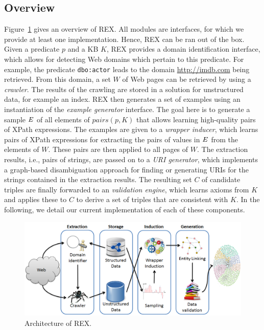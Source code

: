 \subsection{Overview}
Figure~\ref{charex:fig:architecture} gives an overview of REX. 
All modules are interfaces, for which we provide at least one implementation.
Hence, REX can be ran out of the box.
Given a predicate $p$ and a  \ac{KB} $K$, REX provides a domain identification interface, which allows for detecting Web domains which pertain to this predicate.
For example, the predicate \texttt{dbo:actor} leads to the domain \url{http://imdb.com} being retrieved.
From this domain,  a set $W$ of Web pages can be retrieved by using a \emph{crawler}.
The results of the crawling are stored in a solution for unstructured data, for example an index. 
REX then generates a set of examples using an instantiation of the \emph{example generator} interface. 
The goal here is to generate a sample $\mbox{\ensuremath{E}}$ of all elements of $pairs(p, K)$ that allows learning high-quality pairs of XPath expressions. 
The examples are given to a \emph{wrapper inducer}, which learns pairs of XPath expressions for extracting the pairs of values in $\mbox{\ensuremath{E}}$ from the elements of $W$. 
These pairs are then applied to all pages of $W$.
The extraction results, i.e., pairs of strings, are passed on to a \emph{URI generator}, which implements a graph-based disambiguation approach for finding or generating URIs for the strings contained in the extraction results.
The resulting set $C$ of candidate triples are finally forwarded to an \emph{validation engine}, which learns axioms from $K$ and applies these to $C$ to derive a set of triples that are consistent with $K$. 
In the following, we detail our current implementation of each of these components.  

\begin{figure}[htb]
\centering
\includegraphics[width = \textwidth]{part_02/semi_structured_annotation/ISWC_REX/rexArchitecture}
\caption{Architecture of REX.}
\label{charex:fig:architecture}
\end{figure}
